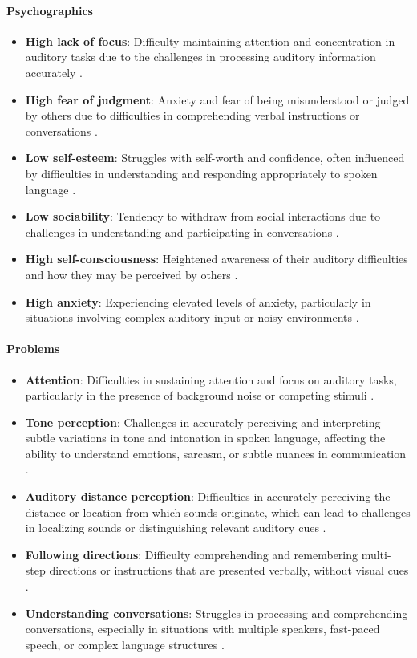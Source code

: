 \paragraph{Psychographics}
\begin{itemize}
    \item \textbf{High lack of focus}: Difficulty maintaining attention and concentration in auditory tasks due to the challenges in processing auditory information accurately \cite{Nationwide}.
    \item \textbf{High fear of judgment}: Anxiety and fear of being misunderstood or judged by others due to difficulties in comprehending verbal instructions or conversations \cite{KidsHealth}.
    \item \textbf{Low self-esteem}: Struggles with self-worth and confidence, often influenced by difficulties in understanding and responding appropriately to spoken language \cite{KidsHealth}.
    \item \textbf{Low sociability}: Tendency to withdraw from social interactions due to challenges in understanding and participating in conversations \cite{KidsHealth}.
    \item \textbf{High self-consciousness}: Heightened awareness of their auditory difficulties and how they may be perceived by others \cite{KidsHealth}.
    \item \textbf{High anxiety}: Experiencing elevated levels of anxiety, particularly in situations involving complex auditory input or noisy environments \cite{KidsHealth}.
\end{itemize}

\paragraph{Problems}
\begin{itemize}
    \item \textbf{Attention}: Difficulties in sustaining attention and focus on auditory tasks, particularly in the presence of background noise or competing stimuli \cite{HearingHealth}.
    \item \textbf{Tone perception}: Challenges in accurately perceiving and interpreting subtle variations in tone and intonation in spoken language, affecting the ability to understand emotions, sarcasm, or subtle nuances in communication \cite{Nationwide}.
    \item \textbf{Auditory distance perception}: Difficulties in accurately perceiving the distance or location from which sounds originate, which can lead to challenges in localizing sounds or distinguishing relevant auditory cues \cite{KidsHealth}.
    \item \textbf{Following directions}: Difficulty comprehending and remembering multi-step directions or instructions that are presented verbally, without visual cues \cite{Nationwide}.
    \item \textbf{Understanding conversations}: Struggles in processing and comprehending conversations, especially in situations with multiple speakers, fast-paced speech, or complex language structures \cite{Nationwide}.
\end{itemize}

